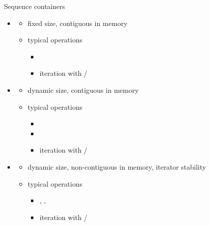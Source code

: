 \begin{frame}[fragile]{Sequence containers \insertcontinuationtext}

  \begin{itemize}
  \item {}
    \begin{itemize}
    \item fixed size, contiguous in memory
    \item typical operations
      \begin{itemize}
      \item {}
      \item iteration with /
      \end{itemize}
    \end{itemize}
  \item {}
    \begin{itemize}
    \item dynamic size, contiguous in memory
    \item typical operations
      \begin{itemize}
      \item {}
      \item {}
      \item iteration with /
      \end{itemize}
    \end{itemize}
  \item {}
    \begin{itemize}
    \item dynamic size, non-contiguous in memory, iterator stability
    \item typical operations
      \begin{itemize}
      \item {}, , 
      \item iteration with /
      \end{itemize}
    \end{itemize}
  \end{itemize}

\end{frame}

